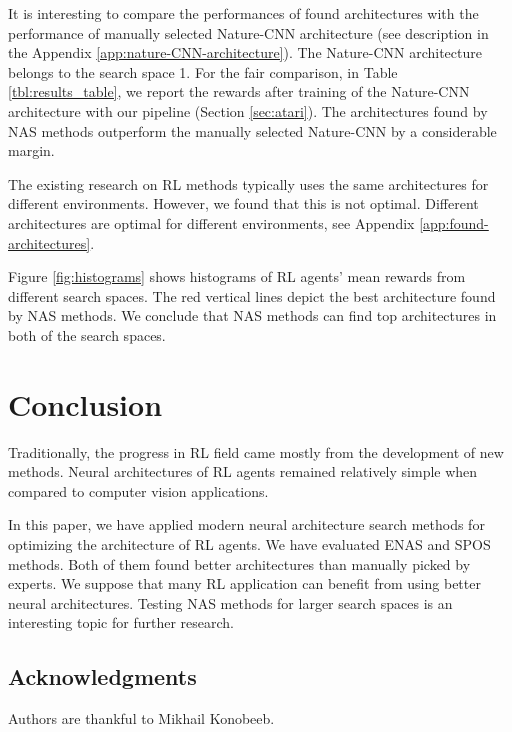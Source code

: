 \documentclass{svproc}
\begin{document}
It is interesting to compare the performances of found architectures with the performance of manually selected Nature-CNN architecture \cite{Humanlevel2015} (see description in the Appendix \ref{app:nature-CNN-architecture}). The Nature-CNN architecture belongs to the search space 1. For the fair comparison, in Table \ref{tbl:results_table}, we report the rewards after training of the Nature-CNN architecture with our pipeline (Section \ref{sec:atari}). The architectures found by NAS methods outperform the manually selected Nature-CNN by a considerable margin.

The existing research on RL methods typically uses the same architectures for different environments.
However, we found that this is not optimal. Different architectures are optimal for different environments, see Appendix \ref{app:found-architectures}.

Figure \ref{fig:histograms} shows histograms of RL agents' mean rewards from different search spaces. The red vertical lines depict the best architecture found by NAS methods. We conclude that NAS methods can find top architectures in both of the search spaces. 



\section{Conclusion}
Traditionally, the progress in RL field came mostly from the development of new methods. Neural architectures of RL agents remained relatively simple when compared to computer vision applications. 

In this paper, we have applied modern neural architecture search methods for optimizing the architecture of RL agents. We have evaluated ENAS \cite{zoph2018learning} and SPOS \cite{guo2019single} methods. Both of them found better architectures than manually picked by experts. We suppose that many RL application can benefit from using better neural architectures.
Testing NAS methods for larger search spaces is an interesting topic for further research.


\subsection*{Acknowledgments}
Authors are thankful to Mikhail Konobeeb.




\nocite{*}
\printbibliography


\newpage
\end{document}
